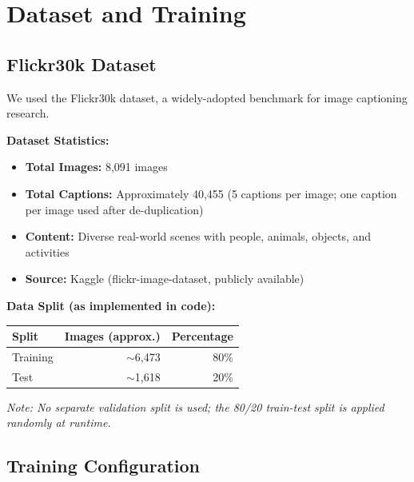 \documentclass[12pt]{article}
\begin{document}
\section{Dataset and Training}

\subsection{Flickr30k Dataset}
We used the Flickr30k dataset, a widely-adopted benchmark for image captioning research.

\textbf{Dataset Statistics:}
\begin{itemize}
\item \textbf{Total Images:} 8,091 images
\item \textbf{Total Captions:} Approximately 40,455 (5 captions per image; one caption per image used after de-duplication)
\item \textbf{Content:} Diverse real-world scenes with people, animals, objects, and activities
\item \textbf{Source:} Kaggle (flickr-image-dataset, publicly available)
\end{itemize}

\textbf{Data Split (as implemented in code):}
\begin{center}
\begin{tabular}{lrr}
\toprule
\textbf{Split} & \textbf{Images (approx.)} & \textbf{Percentage} \\
\midrule
Training & $\sim$6,473 & 80\% \\
Test & $\sim$1,618 & 20\% \\
\bottomrule
\end{tabular}
\end{center}
\textit{Note: No separate validation split is used; the 80/20 train-test split is applied randomly at runtime.}

\subsection{Training Configuration}
\end{document}
